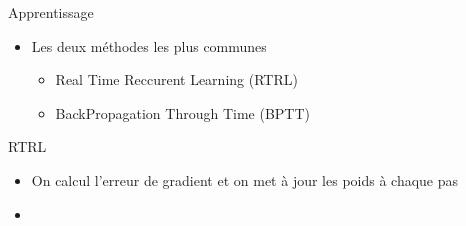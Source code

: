 \begin{frame}{Apprentissage}
	\begin{itemize}
		\item Les deux méthodes les plus communes
		\begin{itemize}
			\item Real Time Reccurent Learning (RTRL) \cite{Robinson87}
			\item BackPropagation Through Time (BPTT) \cite{Williams89}
		\end{itemize}
	\end{itemize}
\end{frame}

\begin{frame}{RTRL}

	\begin{itemize}
		\item On calcul l'erreur de gradient et on met à jour les poids à chaque pas
		\item  
	\end{itemize}
\end{frame}

